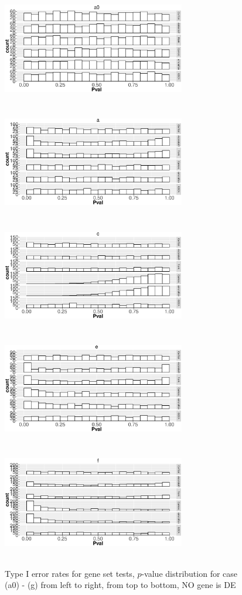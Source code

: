 \documentclass[11pt, a4paper]{article}
\begin{document}
		\begin{figure}[]
			\caption{Type I error rates for gene set tests, $p$-value distribution for case (a0) - (g) from left to right, from top to bottom, NO gene is DE}\label{fig:typeIerror}
			 \begin{center}
				\includegraphics[width=8cm,height=5cm]{Figures/NODEA0.eps}
				\includegraphics[width=8cm,height=5cm]{Figures/NODEA.eps}
				\includegraphics[width=8cm,height=5cm]{Figures/NODEC.eps}
				\includegraphics[width=8cm,height=5cm]{Figures/NODEE.eps}
				\includegraphics[width=8cm,height=5cm]{Figures/NODEF.eps}

\end{center}
\end{figure}
\end{document}
